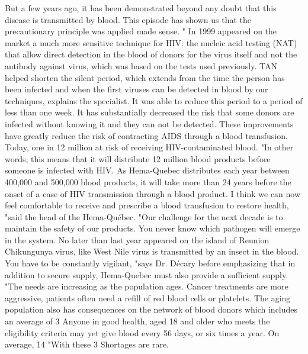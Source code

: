 But a few years ago, it has been demonstrated beyond any doubt that this disease is transmitted by blood.
This episode has shown us that the precautionary principle was applied made sense. "
In 1999 appeared on the market a much more sensitive technique for HIV: the nucleic acid testing (NAT) that allow direct detection in the blood of donors for the virus itself and not the antibody against virus, which was based on the tests used previously.
TAN helped shorten the silent period, which extends from the time the person has been infected and when the first viruses can be detected in blood by our techniques, explains the specialist.
It was able to reduce this period to a period of less than one week.
It has substantially decreased the risk that some donors are infected without knowing it and they can not be detected.
These improvements have greatly reduce the risk of contracting AIDS through a blood transfusion.
Today, one in 12 million at risk of receiving HIV-contaminated blood.
"In other words, this means that it will distribute 12 million blood products before someone is infected with HIV.
As Hema-Quebec distributes each year between 400,000 and 500,000 blood products, it will take more than 24 years before the onset of a case of HIV transmission through a blood product.
I think we can now feel comfortable to receive and prescribe a blood transfusion to restore health, "said the head of the Hema-Québec.
"Our challenge for the next decade is to maintain the safety of our products.
You never know which pathogen will emerge in the system.
No later than last year appeared on the island of Reunion Chikungunya virus, like West Nile virus is transmitted by an insect in the blood.
You have to be constantly vigilant, "says Dr. Décary before emphasizing that in addition to secure supply, Hema-Quebec must also provide a sufficient supply.
"The needs are increasing as the population ages.
Cancer treatments are more aggressive, patients often need a refill of red blood cells or platelets.
The aging population also has consequences on the network of blood donors which includes an average of 3%
Anyone in good health, aged 18 and older who meets the eligibility criteria may yet give blood every 56 days, or six times a year.
On average, 14%
"With these 3%
Shortages are rare.

